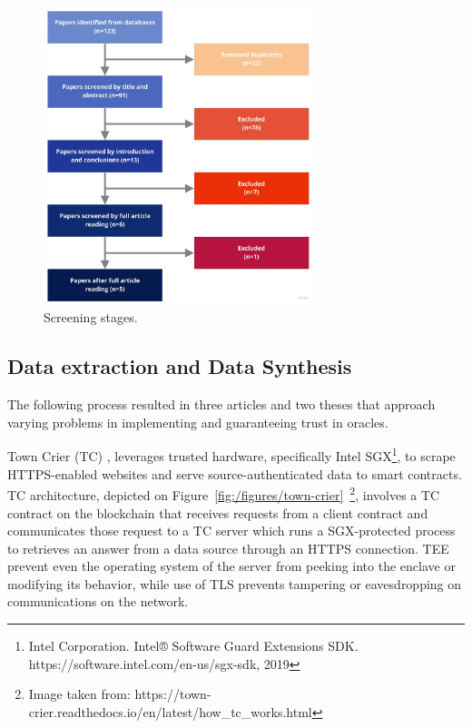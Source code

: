 \begin{figure}[H]
  \begin{center}
    \leavevmode
    \includegraphics[width=0.7\textwidth]{figures/paper-screening.jpg}
    \caption{Screening stages.}
    \label{fig:/figures/paper-screening}
  \end{center}
\end{figure}

\subsection{Data extraction and Data Synthesis}

The following process resulted in three articles and two theses that approach varying problems in implementing and guaranteeing trust in oracles.

Town Crier (TC) \citet{Zhang2016a}, leverages trusted hardware, specifically Intel SGX\footnote{Intel Corporation. Intel® Software Guard Extensions SDK. https://software.intel.com/en-us/sgx-sdk, 2019}, to scrape HTTPS-enabled websites and serve source-authenticated data to smart contracts. TC architecture, depicted on Figure~\ref{fig:/figures/town-crier}~\footnote{Image taken from: https://town-crier.readthedocs.io/en/latest/how\_tc\_works.html}, involves a TC contract on the blockchain that receives requests from a client contract and communicates those request to a TC server which runs a SGX-protected process to retrieves an answer from a data source through an HTTPS connection. TEE prevent even the operating system of the server from peeking into the enclave or modifying its behavior, while use of TLS prevents tampering or eavesdropping on communications on the network.

